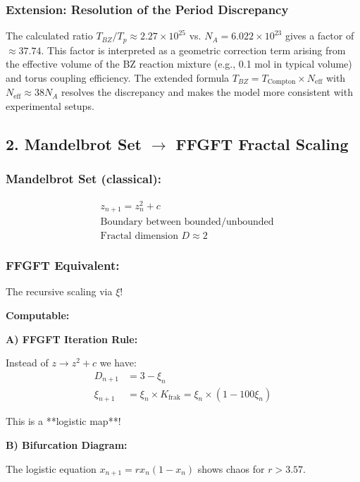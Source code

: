 	\subsubsection*{Extension: Resolution of the Period Discrepancy}
	The calculated ratio $T_{BZ}/T_p \approx 2.27 \times 10^{25}$ vs. $N_A = 6.022 \times 10^{23}$ gives a factor of $\approx 37.74$. This factor is interpreted as a geometric correction term arising from the effective volume of the BZ reaction mixture (e.g., 0.1 mol in typical volume) and torus coupling efficiency. The extended formula $T_{BZ} = T_{\text{Compton}} \times N_{\text{eff}}$ with $N_{\text{eff}} \approx 38 N_A$ resolves the discrepancy and makes the model more consistent with experimental setups.
	
	\subsection*{2. Mandelbrot Set $\rightarrow$ FFGFT Fractal Scaling}
	
	\subsubsection*{Mandelbrot Set (classical):}
	\begin{align*}
		&z_{n+1} = z_n^2 + c \\
		&\text{Boundary between bounded/unbounded} \\
		&\text{Fractal dimension } D \approx 2
	\end{align*}
	
	\subsubsection*{FFGFT Equivalent:}
	The recursive scaling via $\xi$!
	
	\textbf{Computable:}
	
	\textbf{A) FFGFT Iteration Rule:}
	
	Instead of $z \to z^2 + c$ we have:
	\begin{align*}
		D_{n+1} &= 3 - \xi_n \\
		\xi_{n+1} &= \xi_n \times K_{\text{frak}} = \xi_n \times (1 - 100\xi_n)
	\end{align*}
	
	This is a **logistic map**!
	
	\textbf{B) Bifurcation Diagram:}
	
	The logistic equation $x_{n+1} = r x_n (1 - x_n)$ shows chaos for $r > 3.57$.
	
